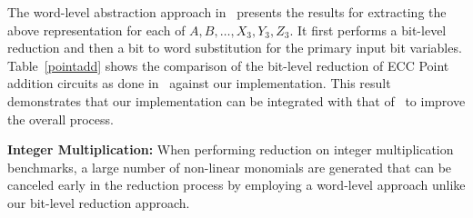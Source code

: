 The word-level abstraction approach in~\cite{pruss:tcad} presents the results for extracting 
the above representation for each of $A,B,\dots, X_3,Y_3,Z_3$. It first performs a bit-level reduction and then a 
bit to word substitution for the primary input bit variables. Table~\ref{pointadd} shows 
the comparison of the bit-level reduction of ECC Point addition circuits as done in~\cite{pruss:tcad}
against our implementation. 
This result demonstrates that our implementation can be integrated with that of~\cite{pruss:tcad} to improve the overall process.  
\par {\bf Integer Multiplication:} When performing reduction on integer multiplication benchmarks, a large number of non-linear 
monomials are generated that can be canceled early in the reduction process by employing a word-level approach unlike 
our bit-level reduction approach.



